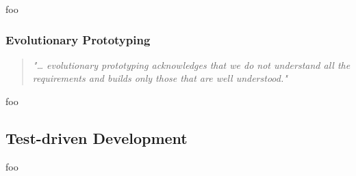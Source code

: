 




foo


\subsubsection{Evolutionary Prototyping}



\begin{quote}
	\textit{"… evolutionary prototyping acknowledges that we do not understand all the requirements and builds only those that are well understood."} \cite{operational_prototyping}
\end{quote}



foo


\subsection{Test-driven Development}

foo
